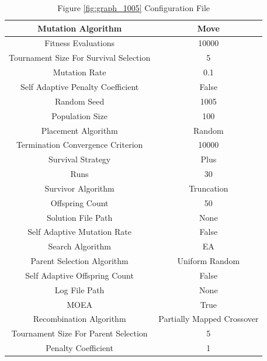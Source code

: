 \documentclass{standalone}
\begin{document}
\begin{table}[!htb]
	\centering
	\caption{Figure \ref{fig:graph_1005} Configuration File}
	\label{tab:graph_1005}
	\begin{tabular}{| c | c |}
		\hline
		Mutation Algorithm		& Move		 \\
		\hline
		Fitness Evaluations		& 10000		 \\
		\hline
		Tournament Size For Survival Selection		& 5		 \\
		\hline
		Mutation Rate		& 0.1		 \\
		\hline
		Self Adaptive Penalty Coefficient		& False		 \\
		\hline
		Random Seed		& 1005		 \\
		\hline
		Population Size		& 100		 \\
		\hline
		Placement Algorithm		& Random		 \\
		\hline
		Termination Convergence Criterion		& 10000		 \\
		\hline
		Survival Strategy		& Plus		 \\
		\hline
		Runs		& 30		 \\
		\hline
		Survivor Algorithm		& Truncation		 \\
		\hline
		Offspring Count		& 50		 \\
		\hline
		Solution File Path		& None		 \\
		\hline
		Self Adaptive Mutation Rate		& False		 \\
		\hline
		Search Algorithm		& EA		 \\
		\hline
		Parent Selection Algorithm		& Uniform Random		 \\
		\hline
		Self Adaptive Offspring Count		& False		 \\
		\hline
		Log File Path		& None		 \\
		\hline
		MOEA		& True		 \\
		\hline
		Recombination Algorithm		& Partially Mapped Crossover		 \\
		\hline
		Tournament Size For Parent Selection		& 5		 \\
		\hline
		Penalty Coefficient		& 1		 \\
		\hline
	\end{tabular}
\end{table}
\end{document}
